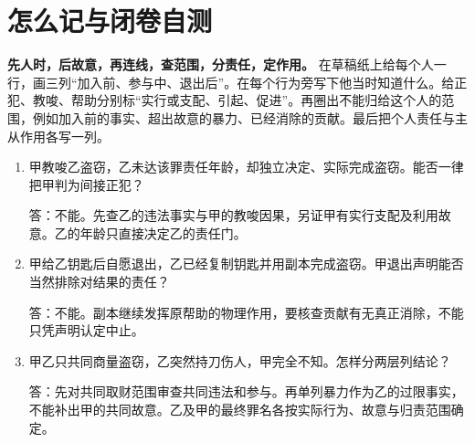 \section*{怎么记与闭卷自测}
\textbf{先人时，后故意，再连线，查范围，分责任，定作用。}
在草稿纸上给每个人一行，画三列“加入前、参与中、退出后”。在每个行为旁写下他当时知道什么。给正犯、教唆、帮助分别标“实行或支配、引起、促进”。再圈出不能归给这个人的范围，例如加入前的事实、超出故意的暴力、已经消除的贡献。最后把个人责任与主从作用各写一列。
\begin{enumerate}
\item 甲教唆乙盗窃，乙未达该罪责任年龄，却独立决定、实际完成盗窃。能否一律把甲判为间接正犯？\par
答：不能。先查乙的违法事实与甲的教唆因果，另证甲有实行支配及利用故意。乙的年龄只直接决定乙的责任门。
\item 甲给乙钥匙后自愿退出，乙已经复制钥匙并用副本完成盗窃。甲退出声明能否当然排除对结果的责任？\par
答：不能。副本继续发挥原帮助的物理作用，要核查贡献有无真正消除，不能只凭声明认定中止。
\item 甲乙只共同商量盗窃，乙突然持刀伤人，甲完全不知。怎样分两层列结论？\par
答：先对共同取财范围审查共同违法和参与。再单列暴力作为乙的过限事实，不能补出甲的共同故意。乙及甲的最终罪名各按实际行为、故意与归责范围确定。
\end{enumerate}

